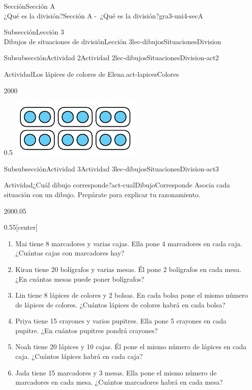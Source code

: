 \begin{sectionptx}{Sección}{{\Large Sección A\\}¿Qué es la división?}{}{Sección A -~¿Qué es la división?}{}{}{gra3-uni4-secA}
\begin{subsectionptx}{Subsección}{{\normalsize Lección 3\\[-0.05cm]}Dibujos de situaciones de división}{}{Lección 3}{}{}{lec-dibujosSituacionesDivision}
\begin{subsubsectionptx}{Subsubsección}{Actividad 2}{}{Actividad 2}{}{}{lec-dibujosSituacionesDivision-act2}
\begin{activity}{Actividad}{Los lápices de colores de Elena.}{act-lapicesColores}
\begin{sidebyside}{2}{0}{0}{0}
\begin{sbspanel}{0.5}
\includegraphics[max width=\linewidth, center]{external/tikz-source/tikz-file-149311.pdf}
\end{sbspanel}%
\end{sidebyside}%
\end{activity}%
\end{subsubsectionptx}
%
%
\typeout{************************************************}
\typeout{************************************************}
%
\begin{subsubsectionptx}{Subsubsección}{Actividad 3}{}{Actividad 3}{}{}{lec-dibujosSituacionesDivision-act3}
\begin{activity}{Actividad}{¿Cuál dibujo corresponde?}{act-cualDibujoCorresponde}%
Asocia cada situación con un dibujo. Prepárate para explicar tu razonamiento.%
\begin{sidebyside}{2}{0}{0}{0.05}%
\begin{sbspanel}{0.55}[center]%
%
\begin{enumerate}
\item{}Mai tiene 8 marcadores y varias cajas. Ella pone 4 marcadores en cada caja. ¿Cuántas cajas con marcadores hay?%
\item{}Kiran tiene 20 bolígrafos y varias mesas. Él pone 2 bolígrafos en cada mesa. ¿En cuántas mesas puede poner bolígrafos?%
\item{}Lin tiene 8 lápices de colores y 2 bolsas. En cada bolsa pone el mismo número de lápices de colores. ¿Cuántos lápices de colores habrá en cada bolsa?%
\item{}Priya tiene 15 crayones y varios pupitres. Ella pone 5 crayones en cada pupitre. ¿En cuántos pupitres pondrá crayones?%
\item{}Noah tiene 20 lápices y 10 cajas. Él pone el mismo número de lápices en cada caja. ¿Cuántos lápices habrá en cada caja?%
\item{}Jada tiene 15 marcadores y 3 mesas. Ella pone el mismo número de marcadores en cada mesa. ¿Cuántos marcadores habrá en cada mesa?%

\end{enumerate}
\end{sbspanel}
\end{sidebyside}
\end{activity}
\end{subsubsectionptx}
\end{subsectionptx}
\end{sectionptx}
